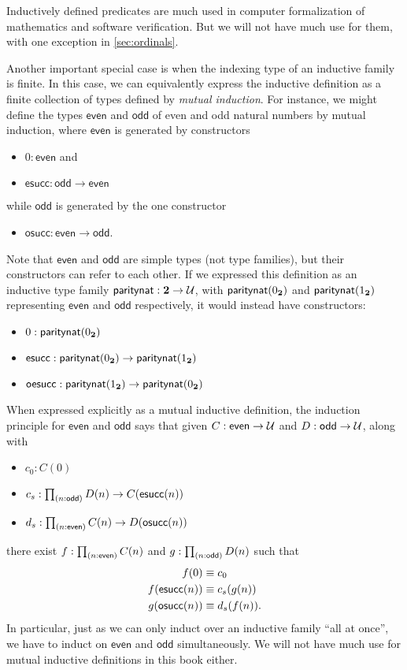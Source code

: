 Inductively defined predicates are much used in computer formalization of mathematics and software verification.
But we will not have much use for them, with one exception in \autoref{sec:ordinals}.

Another important special case is when the indexing type of an inductive family is finite.
In this case, we can equivalently express the inductive definition as a finite collection of types defined by \emph{mutual induction}.
For instance, we might define the types $\mathsf{even}$ and $\mathsf{odd}$ of even and odd natural numbers by mutual induction, where $\mathsf{even}$ is generated by constructors
\begin{itemize}
\item $0:\mathsf{even}$ and
\item $\mathsf{esucc} : \mathsf{odd}\to\mathsf{even}$
\end{itemize}
while $\mathsf{odd}$ is generated by the one constructor
\begin{itemize}
\item $\mathsf{osucc} : \mathsf{even}\to \mathsf{odd}$.
\end{itemize}
Note that $\mathsf{even}$ and $\mathsf{odd}$ are simple types (not type families), but their constructors can refer to each other.
If we expressed this definition as an inductive type family $\mathsf{paritynat} : \mathbf{2} \to \mathcal{U}$, with $\mathsf{paritynat}({0_{\mathbf{2}}})$ and $\mathsf{paritynat}({1_{\mathbf{2}}})$ representing $\mathsf{even}$ and $\mathsf{odd}$ respectively, it would instead have constructors:
\begin{itemize}
\item $0 : \mathsf{paritynat}({0_{\mathbf{2}}})$
\item $\mathsf{esucc} : \mathsf{paritynat}({0_{\mathbf{2}}}) \to \mathsf{paritynat}({1_{\mathbf{2}}})$
\item $\mathsf{oesucc} : \mathsf{paritynat}({1_{\mathbf{2}}}) \to \mathsf{paritynat}({0_{\mathbf{2}}})$
\end{itemize}
When expressed explicitly as a mutual inductive definition, the induction principle for $\mathsf{even}$ and $\mathsf{odd}$ says that given $C:\mathsf{even}\to\mathcal{U}$ and $D:\mathsf{odd}\to\mathcal{U}$, along with
\begin{itemize}
\item $c_0 : C(0)$
\item $c_s : \prd{n:\mathsf{odd}} D(n) \to C(\mathsf{esucc}(n))$
\item $d_s : \prd{n:\mathsf{even}} C(n) \to D(\mathsf{osucc}(n))$
\end{itemize}
there exist $f:\prd{n:\mathsf{even}} C(n)$ and $g:\prd{n:\mathsf{odd}}D(n)$ such that
\begin{align*}
  f(0) &\equiv c_0\\
  f(\mathsf{esucc}(n)) &\equiv c_s(g(n))\\
  g(\mathsf{osucc}(n)) &\equiv d_s(f(n)).
\end{align*}
In particular, just as we can only induct over an inductive family ``all at once'', we have to induct on $\mathsf{even}$ and $\mathsf{odd}$ simultaneously.
We will not have much use for mutual inductive definitions in this book either.


